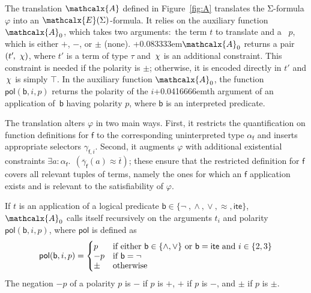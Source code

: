 \documentclass[runningheads,a4paper]{llncs}
\newcommand\pnegate{-}
\newcommand{\con}[1]{\mathsf{#1}}
\renewcommand\vec[1]{\overline{#1}}
\let\oldchi=\chi
\def\chi{{\vthinspace\oldchi}}
\let\oldSigma=\Sigma
\def\Sigma{\mathrm{\oldSigma}}
\let\oldneg=\neg
\def\neg{\oldneg\;}
\let\oldvee=\vee
\def\vee{\mathrel{\oldvee}}
\let\oldwedge=\wedge
\def\wedge{\mathrel{\oldwedge}}
\newcommand{\teq}{\approx}
\newcommand{\conv}{\mathcalx{A}}
\newcommand{\pnone}{{\pm}}
\newcommand{\ppos}{{+}}
\newcommand{\pneg}{{-}}
\newcommand{\pol}{\con{pol}}
\newcommand{\ltrue}{\top}
\newcommand{\lite}{\con{ite}}
\newcommand\concret{\gamma} %
\newcommand{\boolop}{\con{b}}
\newcommand{\vecfarg}[1]{\vec{\concret}_{#1}}
\newcommand{\fargx}[2]{\concret_{#1,#2}}
\newcommand{\fargtype}[1]{\alpha_{#1}}
\newcommand{\extendsig}[1]{\mathcalx{E}( #1 )}
\newcommand{\rem}[1]{\textcolor{red}{[#1]}}
\newcommand{\jb}[1]{\rem{#1 --jb}}
\newcommand{\negvthinspace}{\kern-0.083333em}
\newcommand{\vthinspace}{\kern+0.083333em}
\newcommand{\vvthinspace}{\kern+0.0416666em}
\begin{document}
The translation $\conv$ defined in Figure~\ref{fig:A} translates the $\Sigma$-formula
$\varphi$ into an $\extendsig{\Sigma}$-formula. It relies
on the auxiliary function $\conv_0$, which takes two arguments:\ the term $t$
to translate and a ~$p$, which is either $\ppos$, $\pneg$, or
$\pnone$ (none). \vthinspace$\conv_0$ returns a pair $( t'\negvthinspace,\, \chi )$, where $t'$ is a term of
type $\tau$ and $\chi$ is an additional constraint.
This constraint is needed if the polarity is $\pnone$; otherwise, it is encoded
directly in $t'$ and $\chi$ is simply $\ltrue$.
In the auxiliary function $\conv_0$, the function $\pol(
\boolop, i, p )$ returns the polarity of the $i$\vvthinspace{th} argument of an
application of~$\boolop$ having polarity $p$, where $\boolop$ is an interpreted
predicate.



The translation alters $\varphi$ in two main ways. First, it restricts the
quantification on function definitions for $\con{f}$ to the corresponding
uninterpreted type $\fargtype{\con{f}}$ and inserts appropriate selectors
$\fargx{\con{f}}{i}$. Second, it augments $\varphi$ with additional existential
constraints
$\exists a : \fargtype{\con{f}}.\;\, (\vecfarg{\con{f}}( a ) \teq \vec t)$; these
ensure that the restricted definition for $\con{f}$ covers all relevant tuples
of terms, namely the ones for which an $\con{f}$ application exists and is
relevant to the satisfiability of $\varphi$.

If $t$ is an application of a logical predicate $\boolop
\in \{{\neg}, {\wedge}, {\vee}, {\teq}, {\lite}\}$,
$\conv_0$ calls itself recursively on the arguments $t_i$ and polarity $\pol(
\boolop, i, p )$, where $\pol$ is defined as
\begin{equation*}
\pol( \boolop, i, p ) =
\begin{cases}
p & \text{if either $\boolop \in \{{\wedge}, {\vee}\}$ or $\boolop = \lite$ and $i \in \{2, 3\}$} \\[-\jot]
\pnegate p & \text{if $\boolop = {\neg}$} \\[-\jot]
\pnone & \text{otherwise}
\end{cases}
\end{equation*}
The negation $\pnegate p$ of a polarity $p$ is $\pneg$ if $p$ is $\ppos$, $\ppos$
if $p$ is $\pneg$, and $\pnone$ if $p$ is $\pnone$.
\end{document}
